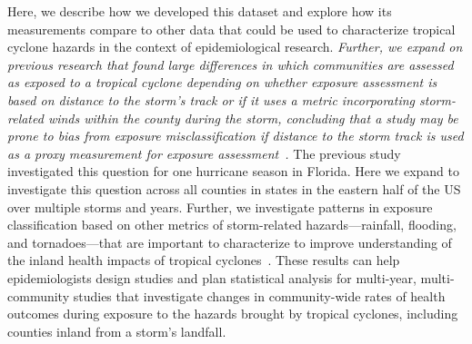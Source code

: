 Here, we describe how we developed this dataset and explore how its
measurements compare to other data that could be used to characterize tropical
cyclone hazards in the context of epidemiological research. \textit{Further, we expand
on previous research that found large differences in which communities are
assessed as exposed to a tropical cyclone depending on whether exposure
assessment is based on distance to the storm's track or if it uses a metric
incorporating storm-related winds within the county during the storm,
concluding that a study may be prone to bias from exposure misclassification if
distance to the storm track is used as a proxy measurement for exposure
assessment~\parencite{grabich2015measuring}.}  The previous study investigated
this question for one hurricane season in Florida. Here we expand to
investigate this question across all counties in states in the eastern half of
the \ac{US} over multiple storms and years.  Further, we investigate patterns
in exposure classification based on other metrics of storm-related
hazards---rainfall, flooding, and tornadoes---that are important to characterize to
improve understanding of the inland health impacts of tropical
cyclones~\parencite{czajkowski2011, moore2012}. These results can help
epidemiologists design studies and plan statistical analysis for
multi-year, multi-community studies that investigate changes in community-wide
rates of health outcomes during exposure to the hazards brought by tropical
cyclones, including counties inland from a storm's landfall. 
